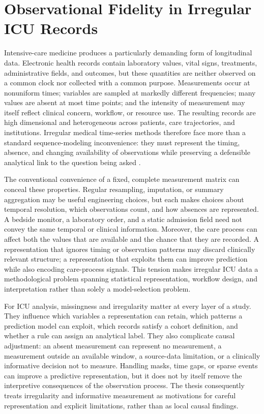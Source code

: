 \section{Observational Fidelity in Irregular ICU Records}
\label{sec:introduction:motivation-irregular-icu-time-series-analysis}

Intensive-care medicine produces a particularly demanding form of longitudinal data.  Electronic health records contain laboratory values, vital signs, treatments, administrative fields, and outcomes, but these quantities are neither observed on a common clock nor collected with a common purpose.  Measurements occur at nonuniform times; variables are sampled at markedly different frequencies; many values are absent at most time points; and the intensity of measurement may itself reflect clinical concern, workflow, or resource use.  The resulting records are high dimensional and heterogeneous across patients, care trajectories, and institutions.  Irregular medical time-series methods therefore face more than a standard sequence-modeling inconvenience: they must represent the timing, absence, and changing availability of observations while preserving a defensible analytical link to the question being asked \cite{sun_2026_review_irregular_medical_timeseries,lipton_kale_wetzel_2016_missingness_rnns}.

The conventional convenience of a fixed, complete measurement matrix can conceal these properties.  Regular resampling, imputation, or summary aggregation may be useful engineering choices, but each makes choices about temporal resolution, which observations count, and how absences are represented.  A bedside monitor, a laboratory order, and a static admission field need not convey the same temporal or clinical information.  Moreover, the care process can affect both the values that are available and the chance that they are recorded.  A representation that ignores timing or observation patterns may discard clinically relevant structure; a representation that exploits them can improve prediction while also encoding care-process signals.  This tension makes irregular ICU data a methodological problem spanning statistical representation, workflow design, and interpretation rather than solely a model-selection problem.

For ICU analysis, missingness and irregularity matter at every layer of a study.  They influence which variables a representation can retain, which patterns a prediction model can exploit, which records satisfy a cohort definition, and whether a rule can assign an analytical label.  They also complicate causal adjustment: an absent measurement can represent no measurement, a measurement outside an available window, a source-data limitation, or a clinically informative decision not to measure.  Handling masks, time gaps, or sparse events can improve a predictive representation, but it does not by itself remove the interpretive consequences of the observation process.  The thesis consequently treats irregularity and informative measurement as motivations for careful representation and explicit limitations, rather than as local causal findings.

